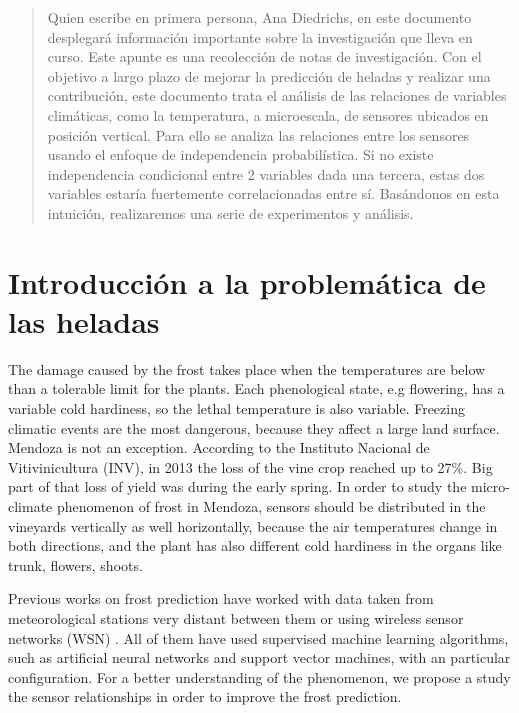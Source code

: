 \documentclass[final,a4paper]{llncs}
\begin{document}
\begin{abstract}

Quien escribe en primera persona, Ana Diedrichs, en este documento desplegar\'{a}
informaci\'{o}n importante sobre la investigaci\'{o}n que lleva en curso. Este 
apunte es una recolecci\'{o}n de notas de investigaci\'{o}n. Con el objetivo a largo 
plazo de mejorar la predicci\'{o}n de heladas y realizar una contribuci\'{o}n, este documento
trata el an\'{a}lisis de las relaciones de variables clim\'{a}ticas, como la temperatura, a 
microescala, de sensores ubicados en posición vertical. 
Para ello se analiza las relaciones entre los sensores usando el enfoque 
de independencia probabilística. Si no existe independencia condicional entre 2 variables 
dada una tercera, estas dos variables estaría fuertemente correlacionadas entre sí.
Basándonos en esta intuición, realizaremos una serie de experimentos y análisis. 

\end{abstract}



\section{Introducci\'{o}n a la problem\'{a}tica de las heladas}


The damage caused by the frost takes place when the temperatures are below 
than a tolerable limit for the plants. Each phenological state, e.g flowering, 
has a variable cold hardiness\cite{snyder2005frost}, so the lethal temperature 
is also variable. Freezing climatic events are the most dangerous, because 
they affect a large land surface. Mendoza is not an exception. According to 
the Instituto Nacional de Vitivinicultura (INV), in 2013 the loss of the 
vine crop reached up to 27\%\cite{inv-news}. Big part of that loss of yield 
was during the early spring. In order to study the micro-climate phenomenon 
of frost in Mendoza, sensors should be distributed in the vineyards vertically 
as well horizontally, because the air temperatures change  in both directions,  
and the plant has also different cold hardiness in the organs like trunk, flowers, shoots.

 
Previous works on frost prediction have worked with data taken from meteorological 
stations very distant between them  \cite{lin2007agroforestry}\cite{ghielmi2006descriptive}
\cite{maqsood2004ensemble} or using wireless sensor networks (WSN) \cite{sallis2009frost2}. 
All of them have used  supervised machine learning algorithms, such as artificial neural 
networks and support vector machines, with an particular configuration. For a better 
understanding of the phenomenon, we propose a study the sensor relationships in order
 to improve the frost prediction.
\end{document}
